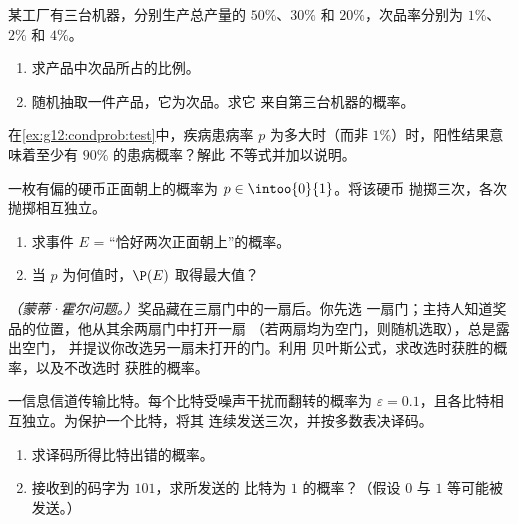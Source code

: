 \begin{exercise}[$\star\star$]\label{exo:g12:condprob:4}
某工厂有三台机器，分别生产总产量的 $50\%$、$30\%$ 和
$20\%$，次品率分别为 $1\%$、$2\%$ 和 $4\%$。
\begin{enumerate}
  \item 求产品中次品所占的比例。
  \item 随机抽取一件产品，它为次品。求它
        来自第三台机器的概率。
\end{enumerate}
\end{exercise}

\begin{exercise}[$\star\star$]\label{exo:g12:condprob:5}
在\cref{ex:g12:condprob:test}中，疾病患病率 $p$ 为多大时（而非
$1\%$）时，阳性结果意味着至少有 $90\%$ 的患病概率？解此
不等式并加以说明。
\end{exercise}

\begin{exercise}[$\star\star$]\label{exo:g12:condprob:6}
一枚有偏的硬币正面朝上的概率为 $p \in \intoo{0}{1}$。将该硬币
抛掷三次，各次抛掷相互独立。
\begin{enumerate}
  \item 求事件 $E$ = “恰好两次正面朝上”的概率。
  \item 当 $p$ 为何值时，$\P(E)$ 取得最大值？
\end{enumerate}
\end{exercise}

\begin{exercise}[$\star\star\star$]\label{exo:g12:condprob:7}
\emph{（蒙蒂·霍尔问题。）}奖品藏在三扇门中的一扇后。你先选
一扇门；主持人知道奖品的位置，他从其余两扇门中打开一扇
（若两扇均为空门，则随机选取），总是露出空门，
并提议你改选另一扇未打开的门。利用
贝叶斯公式，求改选时获胜的概率，以及不改选时
获胜的概率。
\end{exercise}

\begin{exercise}[$\star\star\star$]\label{exo:g12:condprob:8}
一信息信道传输比特。每个比特受噪声干扰而翻转的概率为
$\varepsilon = 0.1$，且各比特相互独立。为保护一个比特，将其
连续发送三次，并按多数表决译码。
\begin{enumerate}
  \item 求译码所得比特出错的概率。
  \item 接收到的码字为 $101$，求所发送的
        比特为 $1$ 的概率？（假设 $0$ 与 $1$ 等可能被发送。）
\end{enumerate}
\end{exercise}

